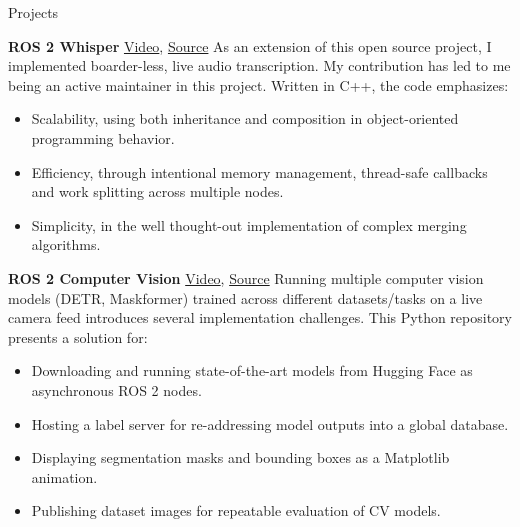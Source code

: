 \begin{rubric}{Projects}

\entry*[2024] \textbf{ROS 2 Whisper} \hfill \href{https://github.com/ros-ai/ros2_whisper/blob/main/doc/harry_potter_sample.gif}{Video}, \href{https://github.com/ros-ai/ros2_whisper}{\faGithub Source} \newline
As an extension of this open source project, I implemented boarder-less, live audio transcription. My contribution has led to me being an active maintainer in this project.  Written in C++, the code emphasizes: \newline
\vspace{\CVItemizeHeaderSpacing} \begin{itemize}
	\setlength{\itemsep}{\CVItemizeSpacing}
	\item Scalability, using both inheritance and composition in object-oriented programming behavior.
	\item Efficiency, through intentional memory management, thread-safe callbacks and work splitting across multiple nodes.
	\item Simplicity, in the well thought-out implementation of complex merging algorithms.
\end{itemize}

\entry*[2024] \textbf{ROS 2 Computer Vision} \hfill \href{https://github.com/NathanCorral/ROS-HF-Vision/blob/main/doc/gifs/ex_german_roads.gif}{Video}, \href{https://github.com/NathanCorral/ROS-HF-Vision/tree/main}{\faGithub Source} \newline
Running multiple computer vision models (DETR, Maskformer) trained across different datasets/tasks on a live camera feed introduces several implementation challenges. This Python repository presents a solution for: \newline
\vspace{\CVItemizeHeaderSpacing} \begin{itemize}
	\setlength{\itemsep}{\CVItemizeSpacing}
	\item Downloading and running state-of-the-art models from Hugging Face as asynchronous ROS 2 nodes.
	\item Hosting a label server for re-addressing model outputs into a global database.
	\item Displaying segmentation masks and bounding boxes as a Matplotlib animation.
	\item Publishing dataset images for repeatable evaluation of CV models.
\end{itemize}


\end{rubric}
